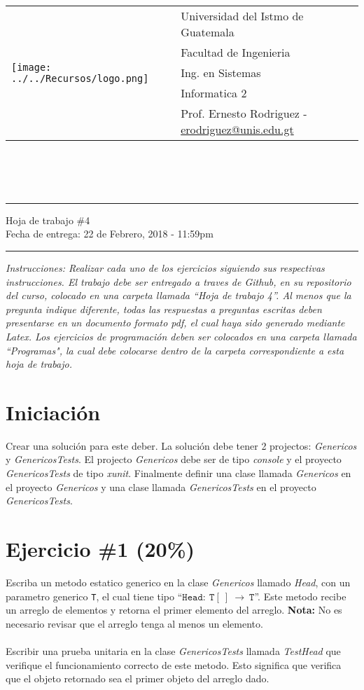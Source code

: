\documentclass{article}
\newcommand{\horrule}[1]{\rule{\linewidth}{#1}}
\newcommand{\perlscript}[2]{
\begin{itemize}
\item[]
\end{itemize}
}
\begin{document}
\begin{tabular}{l l}
\multirow{5}{*}{\texttt{[image: ../../Recursos/logo.png]}} & Universidad del Istmo de Guatemala \\
 & Facultad de Ingenieria \\
 & Ing. en Sistemas \\
 & Informatica 2 \\
 & Prof. Ernesto Rodriguez - \href{mailto:erodriguez@unis.edu.gt}{erodriguez@unis.edu.gt} \\
\end{tabular}
\\\\\\

\begin{center}
        \horrule{0.5pt}
        \huge{Hoja de trabajo \#4} \\
        \large{Fecha de entrega: 22 de Febrero, 2018 - 11:59pm} \\
        \horrule{1pt}
\end{center}
\emph{Instrucciones: Realizar cada uno de los ejercicios siguiendo sus respectivas
instrucciones. El trabajo debe ser entregado a traves de Github, en su repositorio del curso, colocado en una carpeta llamada ``Hoja de trabajo 4''.
Al menos que la pregunta indique diferente, todas las respuestas a preguntas escritas deben presentarse en
un documento formato pdf, el cual haya sido generado mediante Latex. Los ejercicios de programaci\'on deben ser colocados en una carpeta
llamada ``Programas", la cual debe colocarse dentro de la carpeta correspondiente a esta hoja de trabajo.}


\section*{Iniciaci\'on}
Crear una soluci\'on para este deber. La soluci\'on debe tener 2 projectos: \emph{Genericos}
y \emph{GenericosTests}. El projecto \emph{Genericos} debe ser de tipo \emph{console} y el
proyecto \emph{GenericosTests} de tipo \emph{xunit}. Finalmente definir una clase llamada
\emph{Genericos} en el proyecto \emph{Genericos} y una clase llamada \emph{GenericosTests}
en el proyecto \emph{GenericosTests}.

\section*{Ejercicio \#1 (20\%)}
Escriba un metodo estatico generico en la clase \emph{Genericos} llamado \emph{Head}, con un parametro generico \texttt{T},
el cual tiene tipo ``$\mathtt{Head}:\ \mathtt{T[\ ]}\ \rightarrow\ \mathtt{T}$''. Este metodo recibe un arreglo de elementos y
retorna el primer elemento del arreglo. {\bf Nota:} No es necesario revisar que el arreglo
tenga al menos un elemento.
\\\\
Escribir una prueba unitaria en la clase \emph{GenericosTests} llamada \emph{TestHead}
que verifique el funcionamiento correcto de este metodo. Esto significa que verifica
que el objeto retornado sea el primer objeto del arreglo dado.
\end{document}
